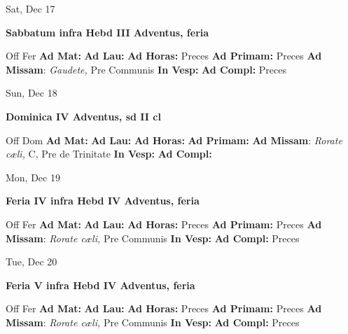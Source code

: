\documentclass[10pt]{article}
\begin{document}
\begin{minipage}{3.5in}
\vspace{2em}\begin{center}
Sat, Dec 17
\end{center}\textbf{ \large Sabbatum infra Hebd III Adventus, \textnormal{\normalsize feria}}
\begin{justify}
Off Fer
\textbf{Ad Mat: }
\textbf{Ad Lau: }
\textbf{Ad Horas: }Preces
\textbf{Ad Primam: }Preces
\textbf{Ad Missam}: \textit{Gaudete,} Pre Communis
\textbf{In Vesp: }
\textbf{Ad Compl: }Preces\end{justify}
\end{minipage}



\begin{minipage}{3.5in}
\vspace{2em}\begin{center}
Sun, Dec 18
\end{center}\textbf{ \large Dominica IV Adventus, \textnormal{\normalsize sd II cl}}
\begin{justify}
Off Dom
\textbf{Ad Mat: }
\textbf{Ad Lau: }
\textbf{Ad Horas: }
\textbf{Ad Primam: }
\textbf{Ad Missam}: \textit{Rorate cæli,} C, Pre de Trinitate
\textbf{In Vesp: }
\textbf{Ad Compl: }\end{justify}
\end{minipage}



\begin{minipage}{3.5in}
\vspace{2em}\begin{center}
Mon, Dec 19
\end{center}\textbf{ \large Feria IV infra Hebd IV Adventus, \textnormal{\normalsize feria}}
\begin{justify}
Off Fer
\textbf{Ad Mat: }
\textbf{Ad Lau: }
\textbf{Ad Horas: }Preces
\textbf{Ad Primam: }Preces
\textbf{Ad Missam}: \textit{Rorate cæli,} Pre Communis
\textbf{In Vesp: }
\textbf{Ad Compl: }Preces\end{justify}
\end{minipage}



\begin{minipage}{3.5in}
\vspace{2em}\begin{center}
Tue, Dec 20
\end{center}\textbf{ \large Feria V infra Hebd IV Adventus, \textnormal{\normalsize feria}}
\begin{justify}
Off Fer
\textbf{Ad Mat: }
\textbf{Ad Lau: }
\textbf{Ad Horas: }Preces
\textbf{Ad Primam: }Preces
\textbf{Ad Missam}: \textit{Rorate cæli,} Pre Communis
\textbf{In Vesp: }
\textbf{Ad Compl: }Preces\end{justify}
\end{minipage}
\end{document}
